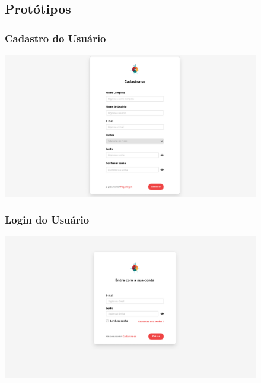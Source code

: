 \documentclass{article}
\begin{document}
\begin{figure}
	\subsection{Protótipos}
	\vspace{30pt}	
	
	\subsubsection{Cadastro do Usuário}
  	\includegraphics[width=\textwidth,  keepaspectratio]{imagens/Cadastro}
  	\vspace{30pt}
  	
  	\subsubsection{Login do Usuário}
  	\includegraphics[width=\textwidth,  keepaspectratio]{imagens/Login}
	\vspace{30pt}
  	
\end{figure}
\end{document}
